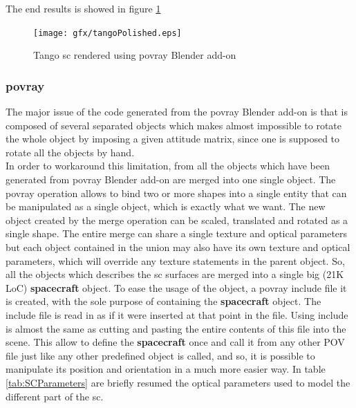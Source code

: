 The end results is showed in figure \ref{fig:tangoblenderfinal}

\begin{figure}
  \centering
  \texttt{[image: gfx/tangoPolished.eps]}
  \caption{Tango \acrshort{sc} rendered using \acrshort{povray} Blender add-on}
  \label{fig:tangoblenderfinal}
\end{figure}

\subsubsection{\acrshort{povray}}
The major issue of the code generated from the  \acrshort{povray} Blender add-on is that is composed of several separated  objects which makes almost impossible to rotate the whole object by imposing a given attitude matrix, since one is supposed to rotate all the  objects by hand.\\
In order to workaround this limitation, from all the  objects which have been generated from \acrshort{povray} Blender add-on are merged into one single  object.
The  \acrshort{povray} operation allows to bind two or more shapes into a single entity that can be manipulated as a single object, which is exactly what we want. The new object created by the merge operation can be scaled, translated and rotated as a single shape. The entire merge can share a single texture and optical parameters but each object contained in the union may also have its own texture and optical parameters, which will override any texture statements in the parent object. So, all the  objects which describes the \acrshort{sc} surfaces are merged into a single big (21K LoC) \textbf{spacecraft}  object.
To ease the usage of the  object, a \acrshort{povray} include file it is created, with the sole purpose of containing the \textbf{spacecraft}  object.
The include file is read in as if it were inserted at that point in the file. Using include is almost the same as cutting and pasting the entire contents of this file into the scene. This allow to define the \textbf{spacecraft}  once and call it from any other POV file just like any other predefined object is called, and so, it is possible to manipulate its position and orientation in a much more easier way.
In table \ref{tab:SCParameters} are briefly resumed the optical parameters used to model the different part of the \acrshort{sc}.

